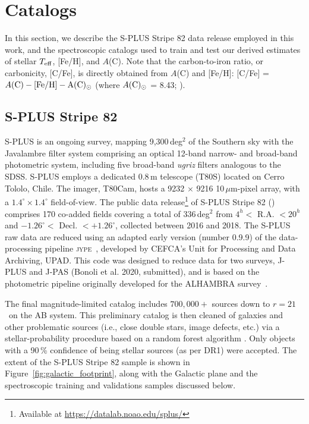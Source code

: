 \documentclass[twocolumn,trackchanges]{aastex63}
\begin{document}

\section{Catalogs}\label{section:Catalogs}

In this section, we describe the S-PLUS Stripe 82 data release employed in this work, and the spectroscopic catalogs used to train and test our derived estimates of stellar $T_{\rm eff}$, [Fe/H], and $A$(C).  Note that the carbon-to-iron ratio, or carbonicity, [C/Fe], is directly obtained from $A$(C) and [Fe/H]:  
[C/Fe] = $A(\rm{C}) - \textrm{[Fe/H]} - A(\rm C)_{\odot}$ (where $A(\rm C)_{\odot}$  = 8.43;  \citealt{Asplund:2009}).

\subsection{S-PLUS Stripe 82}

S-PLUS is an ongoing survey, mapping 9,300\,deg$^2$  of the Southern sky with the Javalambre filter system comprising an optical 12-band narrow- and broad-band photometric system, including five broad-band \textit{ugriz} filters analogous to the SDSS. S-PLUS employs a dedicated 0.8\,m telescope (T80S) located on Cerro Tololo, Chile. The imager, T80Cam, hosts a 9232 $\times$ 9216 10\,$\mu$m-pixel array, with a $1.4^{\circ} \times 1.4^{\circ}$  field-of-view. The public data release\footnote{Available at \href{https://datalab.noao.edu/splus/}{https://datalab.noao.edu/splus/}} of S-PLUS Stripe 82 (\citealt{Mendes:2019}) comprises 170 co-added fields covering a total of 336\,deg$^2$ from $4^h < $ R.A. $ < 20^h$ and $-1.26^{\circ} 
< $ Decl. $ < +1.26^{\circ}$, collected between 2016 and 2018. The S-PLUS raw data are reduced using an adapted early version (number 0.9.9) of the data-processing pipeline \textsc{jype} \citep[see][for details]{2014SPIE.9152E..0OC}, developed by CEFCA's Unit for Processing and Data Archiving, UPAD. This code was designed to reduce data for two surveys, J-PLUS \citep{Cenarro:2019} and J-PAS (Bonoli et al. 2020, submitted), and is based on the photometric pipeline originally developed for the ALHAMBRA survey \citep[see][]{cristobal09, Molino14}. 

 The final magnitude-limited catalog includes $700,000+$ sources down to $r = 21$\ on the AB system. This preliminary catalog is then cleaned of galaxies and other problematic sources (i.e., close double stars, image defects, etc.) via a stellar-probability procedure based on a random forest algorithm \citep{Costa-Duarte:2019}. Only objects with a 90\,\% confidence of being stellar sources (as per DR1) were accepted. The extent of the S-PLUS Stripe 82 sample is shown in Figure~\ref{fig:galactic_footprint}, along with the Galactic plane and the spectroscopic training and validations samples discussed below.
\end{document}
